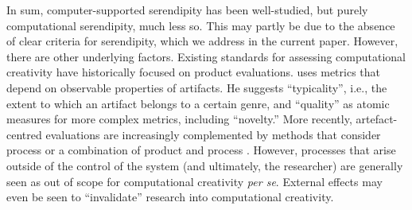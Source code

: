 In sum, computer-supported serendipity has been well-studied, but
purely computational serendipity, much less so.  This may partly be
due to the absence of clear criteria for serendipity, which we address
in the current paper.  However, there are other underlying factors.
Existing standards for assessing computational creativity have
historically focused on product evaluations.
 uses metrics that depend on observable properties of artifacts.  He suggests ``typicality'', i.e., the extent to which an artifact belongs to a certain genre, and ``quality'' as atomic measures for more complex metrics, including ``novelty.''
More recently, artefact-centred evaluations are increasingly complemented by methods
that consider process \cite{colton2008creativity,colton-assessingprogress} or a combination
of product and process \cite{jordanous:12}.  However, processes that
arise outside of the control of the system (and ultimately, the
researcher) are generally seen as out of scope for computational
creativity \emph{per se}.  External effects may even be seen to
``invalidate'' research into computational creativity.
%

